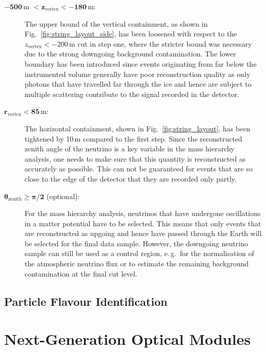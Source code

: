 \begin{description}
 \item[$\mathbf{-500}$\,m $\mathbf{< z_\mathrm{vertex} < -180}$\,m:] The upper
  bound of the vertical containment, as shown in
  Fig.~\ref{fig:string_layout_side}, has been loosened with respect to the
  $z_\mathrm{vertex} < -200$\,m cut in step one, where the stricter bound was
  necessary due to the strong downgoing background contamination. The lower
  boundary has been introduced since events originating from far below the
  instrumented volume generally have poor reconstruction quality as only
  photons that have travelled far through the ice and hence are subject to
  multiple scattering contribute to the signal recorded in the detector.

 \item[$\mathbf{r_\mathrm{vertex} < 85}$\,m:] The horizontal containment, shown
  in Fig.~\ref{fig:string_layout}, has  been tightened by 10\,m compared to the
  first step. Since the reconstructed  zenith angle of the neutrino is a key
  variable in the mass hierarchy  analysis, one needs to make sure that this
  quantity is reconstructed as accurately as possible. This can not be
  guaranteed for events that are so  close to the edge of the detector that they
  are recorded only partly.

 \item[$\mathbf{\theta_\mathrm{zenith} \geq \pi/2}$ (optional):] For the mass
  hierarchy analysis, neutrinos that have undergone oscillations in a matter
  potential have to be selected. This means that only events that are
  reconstructed as upgoing and hence have passed through the Earth will be
  selected for the final data sample. However, the downgoing neutrino sample
  can still be used as a control region, e.\,g.\ for the normalisation of the
  atmospheric neutrino flux or to estimate the remaining background
  contamination at the final cut level.
\end{description}

\subsection{Particle Flavour Identification}
\label{sec:PID}

\section{Next-Generation Optical Modules}
\label{sec:Gen2DOM}

